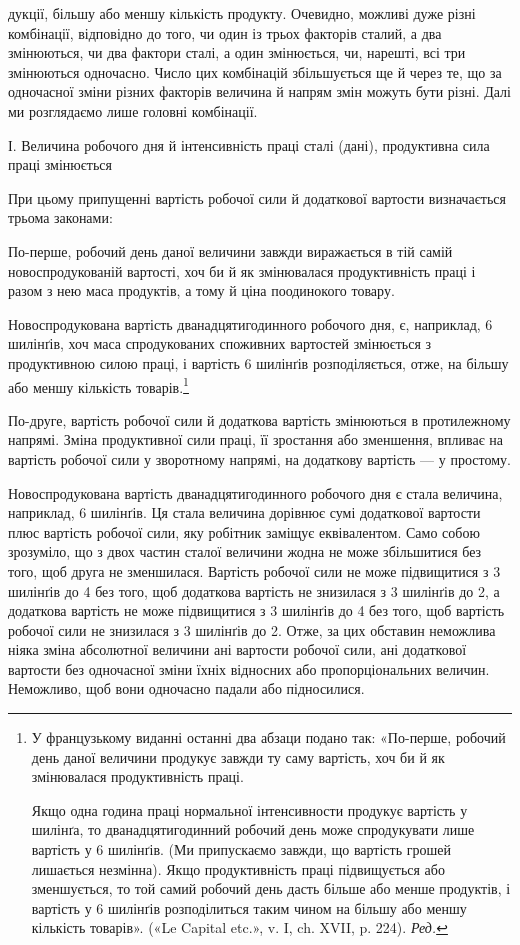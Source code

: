 дукції, більшу або меншу кількість продукту. Очевидно, можливі
дуже різні комбінації, відповідно до того, чи один із трьох факторів
сталий, а два змінюються, чи два фактори сталі, а один
змінюється, чи, нарешті, всі три змінюються одночасно. Число
цих комбінацій збільшується ще й через те, що за одночасної
зміни різних факторів величина й напрям змін можуть бути
різні. Далі ми розглядаємо лише головні комбінації.

І. Величина робочого дня й інтенсивність праці сталі (дані),
продуктивна сила праці змінюється

При цьому припущенні вартість робочої сили й додаткової
вартости визначається трьома законами:

По-перше, робочий день даної величини завжди виражається
в тій самій новоспродукованій вартості, хоч би й як змінювалася
продуктивність праці і разом з нею маса продуктів, а тому й
ціна поодинокого товару.

Новоспродукована вартість дванадцятигодинного робочого
дня, є, наприклад, 6 шилінґів, хоч маса спродукованих споживних
вартостей змінюється з продуктивною силою праці, і вартість
6 шилінґів розподіляється, отже, на більшу або меншу кількість
товарів.\footnote*{
У французькому виданні останні два абзаци подано так: «По-перше,
робочий день даної величини продукує завжди ту саму вартість,
хоч би й як змінювалася продуктивність праці.

Якщо одна година праці нормальної інтенсивности продукує вартість
у  шилінґа, то дванадцятигодинний робочий день може спродукувати
лише вартість у 6 шилінґів. (Ми припускаємо завжди, що вартість грошей
лишається незмінна). Якщо продуктивність праці підвищується або зменшується,
то той самий робочий день дасть більше або менше продуктів,
і вартість у 6 шилінґів розподілиться таким чином на більшу або меншу
кількість товарів». («Le Capital etc.», v. I, ch. XVII, p. 224). \emph{Ред.}
}

По-друге, вартість робочої сили й додаткова вартість змінюються
в протилежному напрямі. Зміна продуктивної сили праці,
її зростання або зменшення, впливає на вартість робочої сили у
зворотному напрямі, на додаткову вартість — у простому.

Новоспродукована вартість дванадцятигодинного робочого
дня є стала величина, наприклад, 6 шилінґів. Ця стала величина
дорівнює сумі додаткової вартости плюс вартість робочої сили,
яку робітник заміщує еквівалентом. Само собою зрозуміло, що
з двох частин сталої величини жодна не може збільшитися без
того, щоб друга не зменшилася. Вартість робочої сили не може
підвищитися з 3 шилінґів до 4 без того, щоб додаткова вартість
не знизилася з 3 шилінґів до 2, а додаткова вартість не може
підвищитися з 3 шилінґів до 4 без того, щоб вартість робочої
сили не знизилася з 3 шилінґів до 2. Отже, за цих обставин неможлива
ніяка зміна абсолютної величини ані вартости робочої
сили, ані додаткової вартости без одночасної зміни їхніх відносних
або пропорціональних величин. Неможливо, щоб вони одночасно
падали або підносилися.